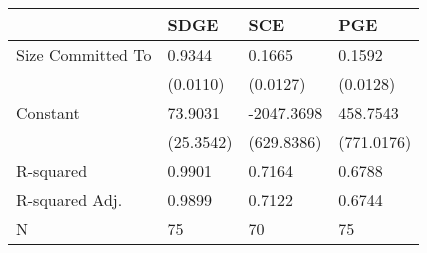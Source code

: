 \begin{tabular}{llll}
\hline
                  & SDGE      & SCE        & PGE         \\
\hline
Size Committed To & 0.9344    & 0.1665     & 0.1592      \\
                  & (0.0110)  & (0.0127)   & (0.0128)    \\
Constant          & 73.9031   & -2047.3698 & 458.7543    \\
                  & (25.3542) & (629.8386) & (771.0176)  \\
R-squared         & 0.9901    & 0.7164     & 0.6788      \\
R-squared Adj.    & 0.9899    & 0.7122     & 0.6744      \\
N                 & 75        & 70         & 75          \\
\hline
\end{tabular}